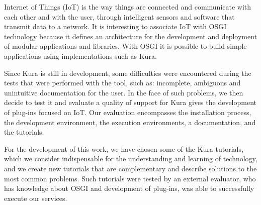Internet of Things (IoT) is the way things are connected and communicate with each other and with the user, through intelligent sensors and software that transmit data to a network. It is interesting to associate IoT with OSGI technology because it defines an architecture for the development and deployment of modular applications and libraries. With OSGI it is possible to build simple applications using implementations such as Kura.

Since Kura is still in development, some difficulties were encountered during the tests that were performed with the tool, such as: incomplete, ambiguous and unintuitive documentation for the user. In the face of such problems, we then decide to test it and evaluate a quality of support for Kura gives the development of plug-ins focused on IoT. Our evaluation encompasses the installation process, the development environment, the execution environments, a documentation, and the tutorials.

For the development of this work, we have chosen some of the Kura tutorials, which we consider indispensable for the understanding and learning of technology, and we create new tutorials that are complementary and describe solutions to the most common problems. Such tutorials were tested by an external evaluator, who has knowledge about OSGI and development of plug-ins, was able to successfully execute our services. 